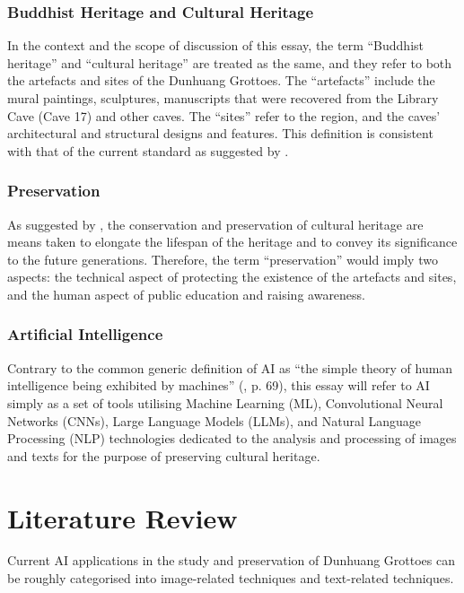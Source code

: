 \subsubsection{Buddhist Heritage and Cultural Heritage}

In the context and the scope of discussion of this essay, the term ``Buddhist heritage'' and ``cultural
heritage'' are treated as the same, and they refer to both the artefacts and sites of the Dunhuang Grottoes.
The ``artefacts'' include the mural paintings, sculptures, manuscripts that were recovered from the Library
Cave (Cave 17) and other caves. The ``sites'' refer to the region, and the caves' architectural and structural
designs and features. This definition is consistent with that of the current standard as suggested by
.

\subsubsection{Preservation}

As suggested by , the conservation and preservation of cultural heritage
are means taken to elongate the lifespan of the heritage and to convey its significance to the future
generations. Therefore, the term ``preservation'' would imply two aspects: the technical aspect of 
protecting the existence of the artefacts and sites, and the human aspect of public education and raising
awareness.

\subsubsection{Artificial Intelligence}

Contrary to the common generic definition of AI as ``the simple theory of human intelligence being
exhibited by machines'' (, p. 69), this essay will refer to AI simply
as a set of tools utilising Machine Learning (ML), Convolutional Neural Networks (CNNs), Large
Language Models (LLMs), and Natural Language Processing (NLP) technologies
dedicated to the analysis and processing of images and texts for the purpose of
preserving cultural heritage.

\section{Literature Review}

Current AI applications in the study and preservation of Dunhuang Grottoes can be roughly categorised into
image-related techniques and text-related techniques.

